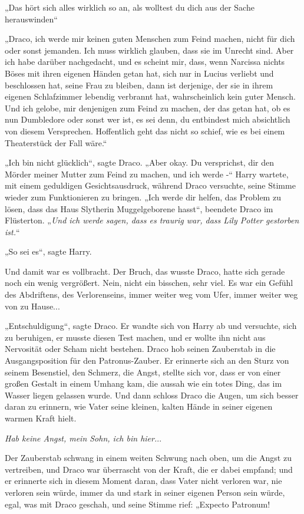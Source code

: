 {„Das hört sich alles wirklich so an, als wolltest du dich aus der Sache herauswinden“

„Draco, ich werde mir keinen guten Menschen zum Feind machen, nicht für dich oder sonst jemanden. Ich muss wirklich glauben, dass sie im Unrecht sind. Aber ich habe darüber nachgedacht, und es scheint mir, dass, wenn Narcissa nichts Böses mit ihren eigenen Händen getan hat, sich nur in Lucius verliebt und beschlossen hat, seine Frau zu bleiben, dann ist derjenige, der sie in ihrem eigenen Schlafzimmer lebendig verbrannt hat, wahrscheinlich kein guter Mensch. Und ich gelobe, mir denjenigen zum Feind zu machen, der das getan hat, ob es nun Dumbledore oder sonst wer ist, es sei denn, du entbindest mich absichtlich von diesem Versprechen. Hoffentlich geht das nicht so schief, wie es bei einem Theaterstück der Fall wäre.“

„Ich bin nicht glücklich“, sagte Draco. „Aber okay. Du versprichst, dir den Mörder meiner Mutter zum Feind zu machen, und ich werde -“ Harry wartete, mit einem geduldigen Gesichtsausdruck, während Draco versuchte, seine Stimme wieder zum Funktionieren zu bringen. „Ich werde dir helfen, das Problem zu lösen, dass das Haus Slytherin Muggelgeborene hasst“, beendete Draco im Flüsterton. „\emph{Und ich werde sagen, dass es traurig war, dass Lily Potter gestorben ist.}“

„So sei es“, sagte Harry.

Und damit war es vollbracht. Der Bruch, das wusste Draco, hatte sich gerade noch ein wenig vergrößert. Nein, nicht ein bisschen, sehr viel. Es war ein Gefühl des Abdriftens, des Verlorenseins, immer weiter weg vom Ufer, immer weiter weg von zu Hause...

„Entschuldigung“, sagte Draco. Er wandte sich von Harry ab und versuchte, sich zu beruhigen, er musste diesen Test machen, und er wollte ihn nicht aus Nervosität oder Scham nicht bestehen. Draco hob seinen Zauberstab in die Ausgangsposition für den Patronus-Zauber. Er erinnerte sich an den Sturz von seinem Besenstiel, den Schmerz, die Angst, stellte sich vor, dass er von einer großen Gestalt in einem Umhang kam, die aussah wie ein totes Ding, das im Wasser liegen gelassen wurde. Und dann schloss Draco die Augen, um sich besser daran zu erinnern, wie Vater seine kleinen, kalten Hände in seiner eigenen warmen Kraft hielt.

\emph{Hab keine Angst, mein Sohn, ich bin hier.}..

Der Zauberstab schwang in einem weiten Schwung nach oben, um die Angst zu vertreiben, und Draco war überrascht von der Kraft, die er dabei empfand; und er erinnerte sich in diesem Moment daran, dass Vater nicht verloren war, nie verloren sein würde, immer da und stark in seiner eigenen Person sein würde, egal, was mit Draco geschah, und seine Stimme rief: „Expecto Patronum!

}

